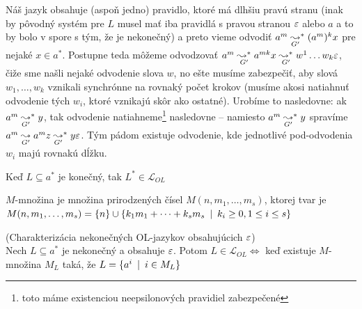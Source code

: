 \begin{dokaz}
\begin{enumerate}
\begin{description}
\begin{description}
              Náš jazyk obsahuje (aspoň jedno) pravidlo, ktoré má
              dlhšiu pravú stranu (inak by pôvodný systém pre $L$
              musel mať iba pravidlá s pravou stranou $\varepsilon$ alebo
              $a$ a to by bolo v spore s tým, že je nekonečný)
              a preto vieme odvodiť
              $a^m \underset{G'}{\leadsto}^* (a^m)^{k} x$ pre nejaké
              $x\in a^{*}$. Postupne teda môžeme odvodzovať
              $a^m \underset{G'}{\leadsto^*} a^{mk} x
                   \underset{G'}{\leadsto^*} w^1 \dots w_k \varepsilon$,
              čiže sme našli nejaké odvodenie slova $w$, no
              ešte musíme zabezpečiť, aby slová $w_1, \dots, w_k$ vznikali
              synchrónne na rovnaký počet krokov
              (musíme akosi natiahnuť odvodenie tých $w_i$,
              ktoré vznikajú skôr ako ostatné).
              Urobíme to nasledovne: ak $a^m
              \underset{G'}{\leadsto}^* y$,
              tak odvodenie natiahneme\footnote{
                  toto máme existenciou neepsilonových pravidiel zabezpečené
              } nasledovne -- namiesto $a^m
              \underset{G'}{\leadsto}^* y$ 
              spravíme
              $a^m \underset{G'}{\leadsto} a^{m} z
                   \underset{G'}{\leadsto}^* y\varepsilon$.
              Tým pádom existuje odvodenie, kde
              jednotlivé pod-odvodenia $w_{i}$ majú rovnakú dĺžku.
          \end{description}
      \end{description}
  \end{enumerate}
\end{dokaz}

\begin{poznamka}
  Keď $L\subseteq a^{*}$ je konečný, tak $L^{*}\in\mathcal{L}_{OL}$
\end{poznamka}

\begin{definicia}
  $M$-množina je množina prirodzených čísel
  $M(n,m_{1},\dots,m_{s})$, ktorej tvar je
  \mbox{$M(n,m_{1},\dots,m_{s})=\{n\}\cup\{k_{1}m_{1}
  +\dots+k_{s}m_{s}\enspace |\enspace k_{i}\geq0,1\leq i\leq s\}$}
\end{definicia}

\begin{veta}
  \label{nekon_ol} (Charakterizácia nekonečných OL-jazykov
  obsahujúcich $\varepsilon$)
  \\ Nech $L\subseteq a^{*}$ je
  ne\-ko\-neč\-ný a obsahuje $\varepsilon$. Potom
  $L\in\mathcal{L}_{OL}\Longleftrightarrow$ keď existuje $M$-množina
  $M_{L}$ taká, že $L=\{a^{i}\enspace |\enspace i\in M_{L}\}$
\end{veta}

